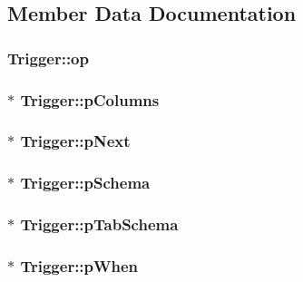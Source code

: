 \subsection{Member Data Documentation}
\hypertarget{struct_trigger_a855d6b6a302d8d80e1d30ddd70fd403e}{
\subsubsection[{op}]{ Trigger\-::op}}\label{struct_trigger_a855d6b6a302d8d80e1d30ddd70fd403e}
\hypertarget{struct_trigger_a8505fbdf63ca9eadf4b2585e99faa4e4}{
\subsubsection[{p\-Columns}]{$\ast$ Trigger\-::p\-Columns}}\label{struct_trigger_a8505fbdf63ca9eadf4b2585e99faa4e4}
\hypertarget{struct_trigger_ac28107e1c45789e0146fe45867b8dfdb}{
\subsubsection[{p\-Next}]{$\ast$ Trigger\-::p\-Next}}\label{struct_trigger_ac28107e1c45789e0146fe45867b8dfdb}
\hypertarget{struct_trigger_a83edbfa91ce6520a6ebc1a21acc2cd5e}{
\subsubsection[{p\-Schema}]{$\ast$ Trigger\-::p\-Schema}}\label{struct_trigger_a83edbfa91ce6520a6ebc1a21acc2cd5e}
\hypertarget{struct_trigger_a8e4a9b3f4bcc5c645e1777b3bb94a6d8}{
\subsubsection[{p\-Tab\-Schema}]{$\ast$ Trigger\-::p\-Tab\-Schema}}\label{struct_trigger_a8e4a9b3f4bcc5c645e1777b3bb94a6d8}
\hypertarget{struct_trigger_a1b6cdd46e8b98562920d1acee86281ed}{
\subsubsection[{p\-When}]{$\ast$ Trigger\-::p\-When}}\label{struct_trigger_a1b6cdd46e8b98562920d1acee86281ed}
